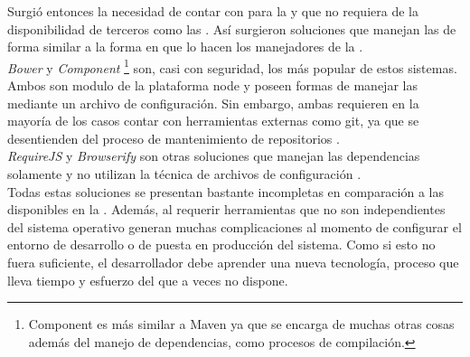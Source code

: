 Surgió entonces la necesidad de contar con \depmgrs para
la \viewtier y que no requiera de la disponibilidad de terceros como las \cdns.
Así surgieron soluciones que manejan las \dependencies de forma similar a la
forma en que lo hacen los manejadores de la \logictier.\\
\emph{Bower} y \emph{Component} \footnote{
	Component es más similar a Maven ya que se encarga de muchas
	otras cosas además del manejo de dependencias, como procesos de compilación.
} son, casi con seguridad, los más popular de estos sistemas. Ambos son modulo de
la plataforma \gls{node} y poseen formas de manejar las \dependencies mediante un
archivo de configuración. Sin embargo, ambas requieren en la mayoría de los casos
contar con herramientas externas como git, ya que se desentienden del proceso de
mantenimiento de repositorios .\\
\emph{RequireJS} y \emph{Browserify} son otras soluciones que manejan las dependencias
\js solamente y no utilizan la técnica de archivos de configuración
.\\
Todas estas soluciones se presentan bastante incompletas en comparación a las
disponibles en la \viewtier. Además, al requerir herramientas que no son
independientes del sistema operativo generan muchas complicaciones al momento
de configurar el entorno de desarrollo o de puesta en producción del sistema.
Como si esto no fuera suficiente, el desarrollador debe aprender una nueva
tecnología, proceso que lleva tiempo y esfuerzo del que a veces no dispone.\\
